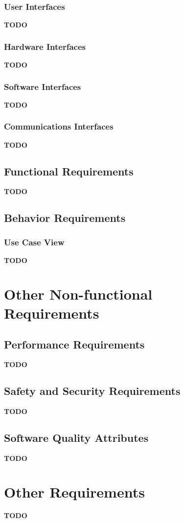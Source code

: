 \documentclass{article}
\newcommand{\todo}{{\LARGE\color{red}\textbf{TODO}}}
\begin{document}
        \subsubsection{User Interfaces}
            \todo
        \subsubsection{Hardware Interfaces}
            \todo
        \subsubsection{Software Interfaces}
            \todo
        \subsubsection{Communications Interfaces}
            \todo
    \subsection{Functional Requirements}
        \todo
    \subsection{Behavior Requirements}
        \subsubsection{Use Case View}
            \todo

\pagebreak
\section{Other Non-functional Requirements}
    \subsection{Performance Requirements}
        \todo
    \subsection{Safety and Security Requirements}
        \todo
    \subsection{Software Quality Attributes}
        \todo

\pagebreak
\section{Other Requirements}
    \todo
\end{document}
